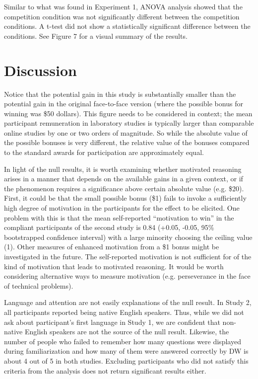 \documentclass{article}
\begin{document}
Similar to what was found in Experiment 1, ANOVA analysis showed that the competition condition was not significantly different between the competition conditions. A t-test did not show a statistically significant difference between the conditions. See Figure 7 for a visual summary of the results. 


\section{Discussion}


Notice that the potential gain in this study is substantially smaller than the potential gain in the original face-to-face version (where the possible bonus for winning was \$50 dollars). This figure needs to be considered in context; the mean participant remuneration in laboratory studies is typically larger than comparable online studies by one or two orders of magnitude. So while the absolute value of the possible bonuses is very different, the relative value of the bonuses compared to the standard awards for participation are approximately equal. 

In light of the null results, it is worth examining whether motivated reasoning arises in a manner that depends on the available gains in a given context, or if the phenomenon requires a significance above certain absolute value (e.g. \$20). First, it could be that the small possible bonus (\$1) fails to invoke a sufficiently high degree of motivation in the participants for the effect to be elicited. One problem with this is that the mean self-reported ``motivation to win'' in the compliant participants of the second study is 0.84 (+0.05, -0.05, 95\% bootstrapped confidence interval) with a large minority choosing the ceiling value (1). Other measures of enhanced motivation from a \$1 bonus might be investigated in the future. The self-reported motivation is not sufficient for of the kind of motivation that leads to motivated reasoning. It would be worth considering alternative ways to measure motivation (e.g. perseverance in the face of technical problems).

Language and attention are not easily explanations of the null result. In Study 2, all participants reported being native English speakers. Thus, while we did not ask about participant's first language in Study 1, we are confident that non-native English speakers are not the source of the null result. Likewise, the number of people who failed to remember how many questions were displayed during familiarization and how many of them were answered correctly by DW is about 4 out of 5 in both studies. Excluding participants who did not satisfy this criteria from the analysis does not return significant results either. 
\end{document}
